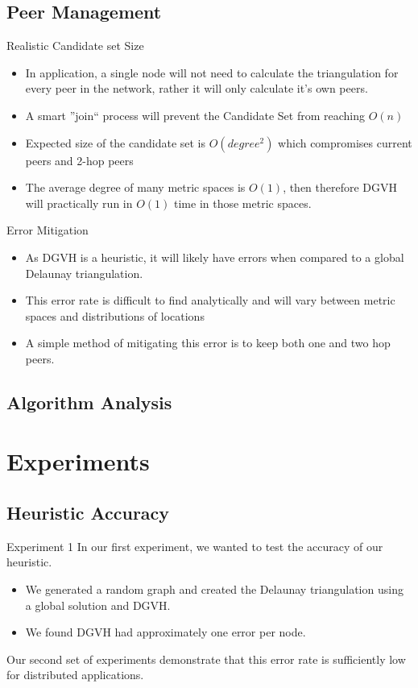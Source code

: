 \documentclass[8pt]{beamer}
\begin{document}
	
	
	
\subsection{Peer Management}
	\begin{frame}{Realistic Candidate set Size}
		\begin{itemize}
			\item In application, a single node will not need to calculate the triangulation for every peer in the network, rather it will only calculate it's own peers.
			\item A smart ''join`` process will prevent the Candidate Set from reaching $O(n)$
			\item Expected size of the candidate set is $O(degree^2)$ which compromises current peers and 2-hop peers
			\item The average degree of many metric spaces is $O(1)$, then therefore DGVH will practically run in $O(1)$ time in those metric spaces.
		\end{itemize}
	\end{frame}
	\begin{frame}{Error Mitigation}
		\begin{itemize}
			\item As DGVH is a heuristic, it will likely have errors when compared to a global Delaunay triangulation.
			\item This error rate is difficult to find analytically and will vary between metric spaces and distributions of locations
			\item A simple method of mitigating this error is to keep both one and two hop peers.
		\end{itemize}
	\end{frame}
	
\subsection{Algorithm Analysis}
	
	
\section{Experiments}
	
\subsection{Heuristic Accuracy}

	\begin{frame}{Experiment 1}
		In our first experiment, we wanted to test the accuracy of our heuristic.
		\begin{itemize}
			\item We generated a random graph and created the Delaunay triangulation using a global solution and DGVH.
			\item We found DGVH had approximately one error per node.
		\end{itemize}
		
		Our second set of experiments demonstrate that this error rate is sufficiently low for distributed applications.
	\end{frame}
\end{document}
